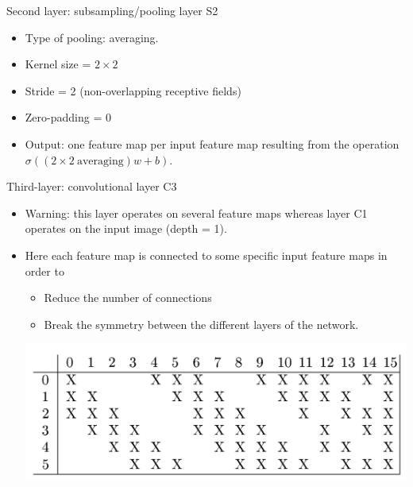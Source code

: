\begin{frame}
	 
	
Second layer: subsampling/pooling layer S2
\begin{itemize}
	\item Type of pooling: averaging.
	\item Kernel size = $2 \times 2$
	\item Stride = 2 (non-overlapping receptive fields)
	\item Zero-padding = 0
	\item Output: one feature map per input feature map resulting from the operation
	$\sigma ( (2 \times 2~ \textrm{averaging}) w + b).$
\end{itemize}

\bigskip 

Third-layer: convolutional layer C3
\begin{itemize}
	\item Warning: this layer operates on several feature maps whereas layer C1 operates on the input image (depth = 1).
	\item Here each feature map is connected to some specific input feature maps in order to 
		 
	\begin{itemize}
		\item Reduce the number of connections
		\item Break the symmetry between the different layers of the network. 
	\end{itemize}

\begin{center}
	\includegraphics[scale=0.3]{figs/Lenet_connections_third_layer}
\end{center}


\end{itemize}
\end{frame}

